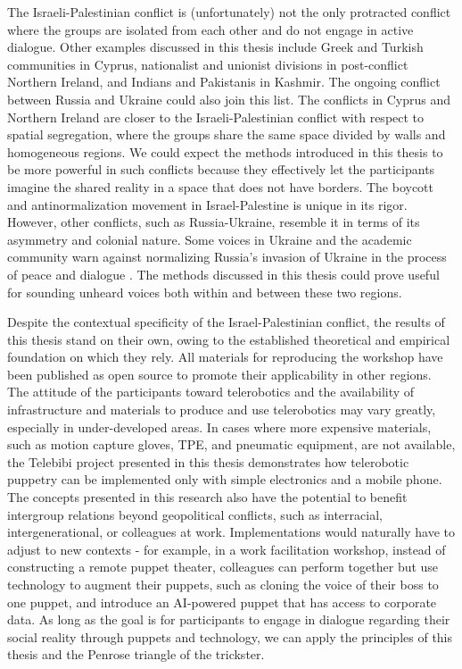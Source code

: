 \documentclass[dissertation,math,vertlayout,pdfa,colorlinks]{aaltoseries}
\begin{document}
The Israeli-Palestinian conflict is (unfortunately) not the only protracted conflict where the groups are isolated from each other and do not engage in active dialogue. Other examples discussed in this thesis include Greek and Turkish communities in Cyprus, nationalist and unionist divisions in post-conflict Northern Ireland, and Indians and Pakistanis in Kashmir. The ongoing conflict between Russia and Ukraine could also join this list. The conflicts in Cyprus and Northern Ireland are closer to the Israeli-Palestinian conflict with respect to spatial segregation, where the groups share the same space divided by walls and homogeneous regions. We could expect the methods introduced in this thesis to be more powerful in such conflicts because they effectively let the participants imagine the shared reality in a space that does not have borders. The boycott and antinormalization movement in Israel-Palestine is unique in its rigor. However, other conflicts, such as Russia-Ukraine, resemble it in terms of its asymmetry and colonial nature. Some voices in Ukraine and the academic community warn against normalizing Russia's invasion of Ukraine in the process of peace and dialogue \cite{makarychevNormalizeRationalizeIntellectuals2023}. The methods discussed in this thesis could prove useful for sounding unheard voices both within and between these two regions. 

Despite the contextual specificity of the Israel-Palestinian conflict, the results of this thesis stand on their own, owing to the established theoretical and empirical foundation on which they rely. All materials for reproducing the workshop have been published as open source to promote their applicability in other regions. The attitude of the participants toward telerobotics and the availability of infrastructure and materials to produce and use telerobotics may vary greatly, especially in under-developed areas. In cases where more expensive materials, such as motion capture gloves, TPE, and pneumatic equipment, are not available, the Telebibi project presented in this thesis demonstrates how telerobotic puppetry can be implemented only with simple electronics and a mobile phone. The concepts presented in this research also have the potential to benefit intergroup relations beyond geopolitical conflicts, such as interracial, intergenerational, or colleagues at work. Implementations would naturally have to adjust to new contexts - for example, in a work facilitation workshop, instead of constructing a remote puppet theater, colleagues can perform together but use technology to augment their puppets, such as cloning the voice of their boss to one puppet, and introduce an AI-powered puppet that has access to corporate data. As long as the goal is for participants to engage in dialogue regarding their social reality through puppets and technology, we can apply the principles of this thesis and the Penrose triangle of the trickster.
\end{document}
